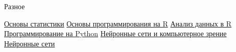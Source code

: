 \begin{rubric}{Разное}

\entry*[Stepik] \href{ https://stepik.org/cert/1732345 }{Основы статистики}
\entry*[Stepik] \href{ https://stepik.org/cert/1749332 }{Основы программирования на R}
\entry*[Stepik] \href{ https://stepik.org/cert/1773184 }{Анализ данных в R}
\entry*[Stepik] \href{ https://stepik.org/cert/1794720 }{Программирование на Python}
\entry*[Stepik] \href{ https://stepik.org/cert/1900707 }{Нейронные сети и компьютерное зрение}
\entry*[Stepik] \href{ https://stepik.org/cert/1980647 }{Нейронные сети}

\end{rubric}